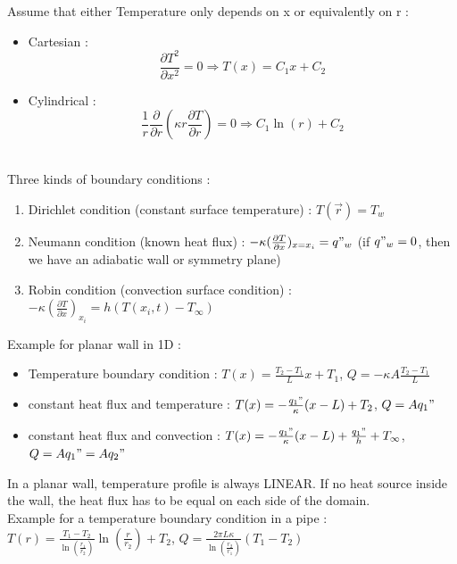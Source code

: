 \documentclass[../main.tex]{subfiles}
\begin{document}
Assume that either Temperature only depends on x or equivalently on r : \begin{itemize}
    \item Cartesian : \begin{equation}
        \frac{\partial T^2}{\partial x^2} = 0 \Rightarrow T(x) = C_1x + C_2
    \end{equation}
    \item Cylindrical : \begin{equation}\frac{1}{r} \frac{\partial}{\partial r}(\kappa r \frac{\partial T}{\partial r}) = 0 \Rightarrow C_1 \ln(r) + C_2 \end{equation}\\
\end{itemize}

Three kinds of boundary conditions : \begin{enumerate}
    \item Dirichlet condition (constant surface temperature) : $T(\Vec{r}) = T_w$\\
    \item Neumann condition (known heat flux) : $-\kappa(\frac{\partial T}{\partial x})_{x=x_i} = q"_w$ (if $q"_w = 0$, then we have an adiabatic wall or symmetry plane)\\
    \item Robin condition (convection surface condition) : $-\kappa (\frac{\partial T}{\partial x})_{x_i} = h(T(x_i,t)-T_\infty)$\\
\end{enumerate}

Example for planar wall in 1D : \begin{itemize}
    \item Temperature boundary condition : $T(x) = \frac{T_2-T_1}{L}x+T_1$, $Q = -\kappa A \frac{T_2-T_1}{L}$ 
    \item constant heat flux and temperature : $T(x) = -\frac{q_1"}{\kappa} (x-L) + T_2$, $Q = Aq_1"$\\
    \item constant heat flux and convection : $T(x) = -\frac{q_1"}{\kappa}(x-L) + \frac{q_1"}{h} + T_\infty$, $Q = Aq_1" = Aq_2"$\\
\end{itemize}

\warning In a planar wall, temperature profile is always LINEAR. If no heat source inside the wall, the heat flux has to be equal on each side of the domain.\\

Example for a temperature boundary condition in a pipe : $T(r) = \frac{T_1-T_2}{\ln(\frac{r_1}{r_2})} \ln(\frac{r}{r_2}) + T_2$, $Q = \frac{2\pi L \kappa}{\ln(\frac{r_2}{r_1})}(T_1-T_2)$\\
\end{document}
